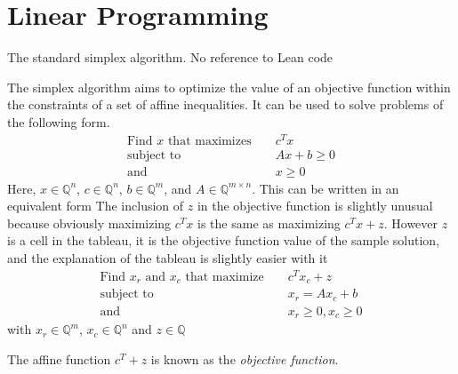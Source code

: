 \documentclass[11pt]{article} %
\begin{document}
\section{Linear Programming}
\color{red} The standard simplex algorithm. No reference to Lean code \color{black}

The simplex algorithm aims to optimize the value of an objective function within the constraints of a set of affine inequalities. It can be used to solve problems of the following form.
\begin{equation}
  \begin{aligned}
    \text{Find } x \text{ that maximizes } && c^Tx \\
    \text{subject to } && A x + b \ge 0\\
    \text{and } && x \ge 0
  \end{aligned}
\end{equation}
Here, $x \in \mathbb{Q}^n$, $c \in \mathbb{Q}^n$, $b \in \mathbb{Q}^m$, and $A \in \mathbb{Q}^{m \times n}$.
This can be written in an equivalent form \color{red} The inclusion of $z$ in the objective function is slightly unusual because obviously maximizing $c^Tx$ is the same as maximizing $c^Tx + z$. However $z$ is a cell in the tableau, it is the objective function value of the sample solution, and the explanation of the tableau is slightly easier with it\color{black}
\begin{equation}
  \begin{aligned}
    \text{Find } x_r \text{ and } x_c \text{ that maximize } && c^Tx_c + z \\
    \text{subject to } && x_r = A x_c + b \\
    \text{and } && x_r \ge 0, x_c \ge 0
  \end{aligned}
\end{equation}
with $x_r \in \mathbb{Q}^m$, $x_c \in \mathbb{Q}^n$ and $z \in \mathbb{Q}$

The affine function $c^T+z$ is known as the \textit{objective function}.
\end{document}
